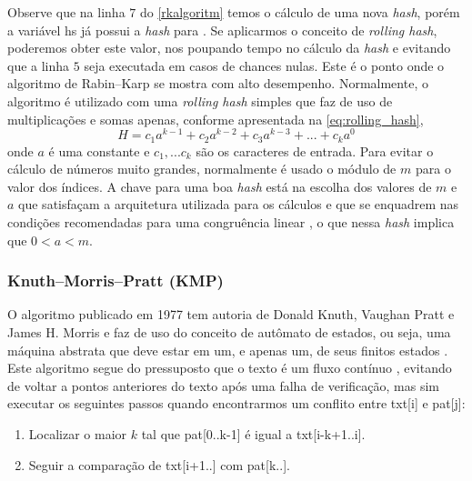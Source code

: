 Observe que na linha $7$ do \autoref{rkalgoritm} temos o cálculo de uma nova \textit{hash}, porém a variável {\code hs} já possui a \textit{hash} para {}. Se aplicarmos o conceito de \textit{rolling hash}, poderemos obter este valor, nos poupando tempo no cálculo da \textit{hash} e evitando que a linha $5$ seja executada em casos de chances nulas. Este é o ponto onde o algoritmo de Rabin–Karp se mostra com alto desempenho. Normalmente, o algoritmo é utilizado com uma \textit{rolling hash} simples que faz de uso  de multiplicações e somas apenas, conforme apresentada na \autoref{eq:rolling_hash},
%
\begin{equation}\label{eq:rolling_hash}
	H=c_1a^{k-1}+ c_2a^{k-2} + c_3a^{k-3} + ... + c_ka^{0}
\end{equation}
%
onde $a$ é uma constante e $c_1,...c_k$ são os caracteres de entrada. Para evitar o cálculo de números muito grandes, normalmente é usado o módulo de $m$ para o valor dos índices. A chave para uma boa \textit{hash} está na escolha dos valores de $m$ e $a$ que satisfaçam a arquitetura utilizada para os cálculos e que se enquadrem nas condições recomendadas para uma congruência linear \cite{knuth1998art}, o que nessa \textit{hash} implica que $0<a<m$.


\subsubsection*{Knuth–Morris–Pratt (KMP)} %
\label{ssub:knuth_morris_pratt_}

O algoritmo publicado em 1977 tem autoria de  Donald Knuth, Vaughan Pratt e James H. Morris e faz de uso do conceito de autômato de estados, ou seja, uma máquina abstrata que deve estar em um, e apenas um, de seus finitos estados \cite{thierbach1985finite}. Este algoritmo segue do pressuposto que o texto é um fluxo contínuo \cite{paulo2015algoritmos}, evitando de voltar a pontos anteriores do texto após uma falha de verificação, mas sim executar os seguintes passos quando encontrarmos um conflito entre {\code txt[i]} e {\code pat[j]}:

\begin{enumerate}
	\item Localizar o maior $k$ tal que {\code pat[0..k-1]} é igual a {\code txt[i-k+1..i]}.
	\item Seguir a comparação de {\code txt[i+1..]} com {\code pat[k..]}.
\end{enumerate}

